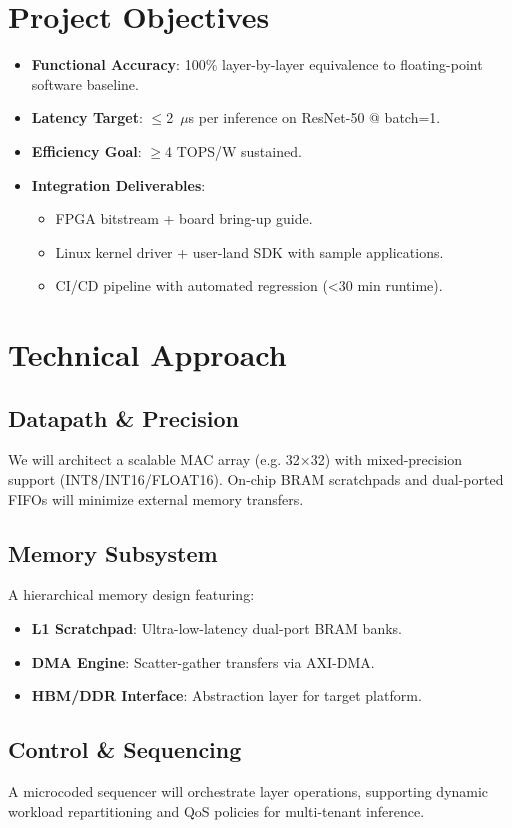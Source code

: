 \documentclass[10pt,twocolumn]{article}
\begin{document}
\section{Project Objectives}
\begin{itemize}
  \item \textbf{Functional Accuracy}: 100\% layer-by-layer equivalence to floating-point software baseline.
  \item \textbf{Latency Target}: $\leq$2~$\mu$s per inference on ResNet-50 @ batch=1.
\item \textbf{Efficiency Goal}: $\geq$4 TOPS/W sustained.
  \item \textbf{Integration Deliverables}: 
    \begin{itemize}
      \item FPGA bitstream + board bring-up guide.
      \item Linux kernel driver + user-land SDK with sample applications.
      \item CI/CD pipeline with automated regression (<30 min runtime).
    \end{itemize}
\end{itemize}

\section{Technical Approach}
\subsection*{Datapath \& Precision}
We will architect a scalable MAC array (e.g. 32×32) with mixed-precision support (INT8/INT16/FLOAT16). On-chip BRAM scratchpads and dual-ported FIFOs will minimize external memory transfers.

\subsection*{Memory Subsystem}
A hierarchical memory design featuring:
\begin{itemize}
  \item \textbf{L1 Scratchpad}: Ultra-low-latency dual-port BRAM banks.
  \item \textbf{DMA Engine}: Scatter-gather transfers via AXI-DMA.
  \item \textbf{HBM/DDR Interface}: Abstraction layer for target platform.
\end{itemize}

\subsection*{Control \& Sequencing}
A microcoded sequencer will orchestrate layer operations, supporting dynamic workload repartitioning and QoS policies for multi-tenant inference.
\end{document}
